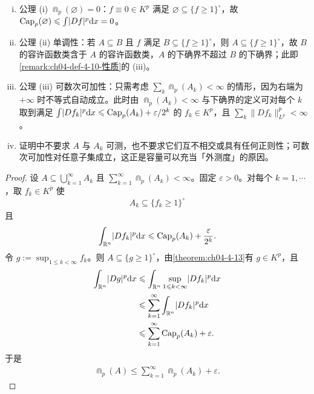 \documentclass[../../main.tex]{subfiles}%
\begin{document}
\begin{remark}\label{remark:ch04-thm-4-14-条件}
\begin{enumerate}[(i)]
\item 公理 (i) $\Cap_p(\varnothing)=0$：$f\equiv0\in K^p$ 满足 $\varnothing\subseteq\{f\geqslant1\}^{\circ}$，故 $\operatorname{Cap}_p(\varnothing)\leqslant\int\lvert Df\rvert^p\mathrm{d} x=0$。
\item 公理 (ii) 单调性：若 $A\subseteq B$ 且 $f$ 满足 $B\subseteq\{f\geqslant1\}^{\circ}$，则 $A\subseteq\{f\geqslant1\}^{\circ}$，故 $B$ 的容许函数类含于 $A$ 的容许函数类，$A$ 的下确界不超过 $B$ 的下确界；此即\cref{remark:ch04-def-4-10-性质}的 (iii)。%
\item 公理 (iii) 可数次可加性：只需考虑 $\sum_k\Cap_p(A_k)<\infty$ 的情形，因为右端为 $+\infty$ 时不等式自动成立。此时由 $\Cap_p(A_k)<\infty$ 与下确界的定义可对每个 $k$ 取到满足 $\int\lvert Df_k\rvert^p\mathrm{d} x\leqslant\operatorname{Cap}_p(A_k)+\varepsilon/2^k$ 的 $f_k\in K^p$，且 $\sum_k\lVert Df_k\rVert_{L^p}^p<\infty$。
\item 证明中不要求 $A$ 与 $A_k$ 可测，也不要求它们互不相交或具有任何正则性；可数次可加性对任意子集成立，这正是容量可以充当「外测度」的原因。
\end{enumerate}
\end{remark}

\begin{proof}
设 $A\subseteq\bigcup_{k=1}^{\infty}A_k$ 且 $\sum_{k=1}^{\infty}\Cap_p(A_k)<\infty$。固定 $\varepsilon>0$。对每个 $k=1,\cdots$，取 $f_k\in K^p$ 使
\begin{align*}
A_k\subseteq\{f_k\geqslant1\}^{\circ}
\end{align*}
且
\begin{align*}
\int_{\mathbb{R}^n}\lvert Df_k\rvert^p\mathrm{d} x\leqslant\operatorname{Cap}_p(A_k)+\frac{\varepsilon}{2^k}.
\end{align*}
令 $g:=\sup_{1\leqslant k<\infty}f_k$。则 $A\subseteq\{g\geqslant1\}^{\circ}$，由\cref{theorem:ch04-4-13}有 $g\in K^p$，且%
\begin{align*}
\int_{\mathbb{R}^n}\lvert Dg\rvert^p\mathrm{d} x&\leqslant\int_{\mathbb{R}^n}\sup_{1\leqslant k<\infty}\lvert Df_k\rvert^p\mathrm{d} x\\
&\leqslant\sum_{k=1}^{\infty}\int_{\mathbb{R}^n}\lvert Df_k\rvert^p\mathrm{d} x\\
&\leqslant\sum_{k=1}^{\infty}\operatorname{Cap}_p(A_k)+\varepsilon .
\end{align*}
于是
\begin{align*}
\Cap_p(A)\leqslant\sum_{k=1}^{\infty}\Cap_p(A_k)+\varepsilon .
\end{align*}
\end{proof}
\end{document}
